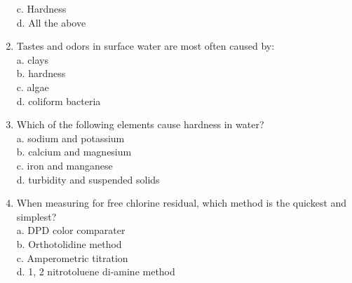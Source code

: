 \begin{enumerate}[1.]
c. Hardness\\
d. All the above\\
\item Tastes and odors in surface water are most often caused by:\\
a. clays\\
b. hardness\\
c. algae\\
d. coliform bacteria\\
\item Which of the following elements cause hardness in water?\\
a. sodium and potassium\\
b. calcium and magnesium\\
c. iron and manganese\\
d. turbidity and suspended solids\\
\item When measuring for free chlorine residual, which method is the quickest and simplest?\\
a. DPD color comparater\\
b. Orthotolidine method\\
c. Amperometric titration\\
d. 1, 2 nitrotoluene di-amine method\\

\end{enumerate}
